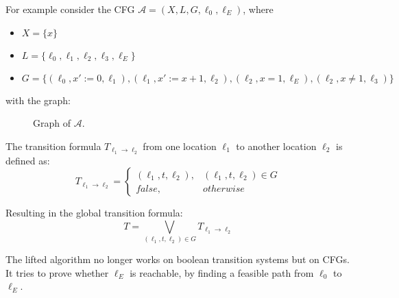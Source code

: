 \documentclass[11pt, a4paper, BCOR=10mm, ngerman]{scrbook}
\begin{document}
For example consider the CFG $\mathcal{A} = (X, L, G, \ell_0, \ell_E)$, where
\begin{itemize}
\item $X = \{x\}$
\item $L = \{\ell_0, \ell_1, \ell_2, \ell_3, \ell_E\}$
\item $G = \{(\ell_0, x' := 0, \ell_1), (\ell_1, x' := x + 1, \ell_2), (\ell_2, x = 1, \ell_E), (\ell_2, x \neq 1, \ell_3) \} $
\end{itemize}
\pagebreak
with the graph: \\

\begin{figure}[H]
\centering
{}
  \caption{Graph of $\mathcal{A}$.}
 \end{figure}
 \label{ex7} 

The transition formula $T_{\ell_1 \rightarrow \ell_2}$ from one location $\ell_1$ to another location $\ell_2$ is defined as:
\begin{equation*}
T_{\ell_1 \rightarrow \ell_2} = \begin{cases} (\ell_1, t, \ell_2), & (\ell_1, t, \ell_2) \in G \\
                     false, & otherwise
       \end{cases}
\end{equation*}

Resulting in the global transition formula: \\
$$ T = \bigvee_{(\ell_1, t, \ell_2) \in G} T_{\ell_1 \rightarrow \ell_2}$$

The lifted algorithm no longer works on boolean transition systems but on CFGs. It tries to prove whether $\ell_E$ is reachable, by finding a feasible path from $\ell_0$ to $\ell_E$.
\end{document}

